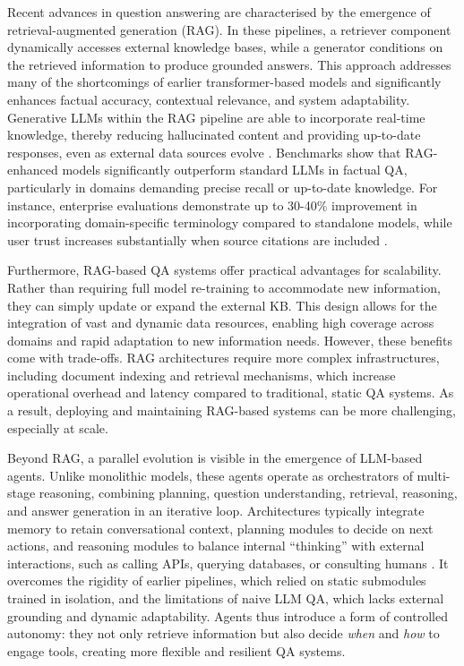 \begin{spacing}{1.5}
Recent advances in question answering are characterised by the emergence of retrieval-augmented generation (RAG). In these pipelines, a retriever component dynamically accesses external knowledge bases, while a generator conditions on the retrieved information to produce grounded answers. This approach addresses many of the shortcomings of earlier transformer-based models and significantly enhances factual accuracy, contextual relevance, and system adaptability. Generative LLMs within the RAG pipeline are able to incorporate real-time knowledge, thereby reducing hallucinated content and providing up-to-date responses, even as external data sources evolve \citep{yue_survey_2025,lewis_retrieval-augmented_2020}. Benchmarks show that RAG-enhanced models significantly outperform standard LLMs in factual QA, particularly in domains demanding precise recall or up-to-date knowledge. For instance, enterprise evaluations demonstrate up to 30-40\% improvement in incorporating domain-specific terminology compared to standalone models, while user trust increases substantially when source citations are included \citep{vaibhav_retrieval-augmented_2025}.

Furthermore, RAG-based QA systems offer practical advantages for scalability. Rather than requiring full model re-training to accommodate new information, they can simply update or expand the external KB. This design allows for the integration of vast and dynamic data resources, enabling high coverage across domains and rapid adaptation to new information needs. However, these benefits come with trade-offs. RAG architectures require more complex infrastructures, including document indexing and retrieval mechanisms, which increase operational overhead and latency compared to traditional, static QA systems. As a result, deploying and maintaining RAG-based systems can be more challenging, especially at scale.

Beyond RAG, a parallel evolution is visible in the emergence of LLM-based agents. Unlike monolithic models, these agents operate as orchestrators of multi-stage reasoning, combining planning, question understanding, retrieval, reasoning, and answer generation in an iterative loop. Architectures typically integrate memory to retain conversational context, planning modules to decide on next actions, and reasoning modules to balance internal ``thinking'' with external interactions, such as calling APIs, querying databases, or consulting humans \parencite{yue_survey_2025}. It overcomes the rigidity of earlier pipelines, which relied on static submodules trained in isolation, and the limitations of naive LLM QA, which lacks external grounding and dynamic adaptability. Agents thus introduce a form of controlled autonomy: they not only retrieve information but also decide \textit{when} and \textit{how} to engage tools, creating more flexible and resilient QA systems.


\end{spacing}
